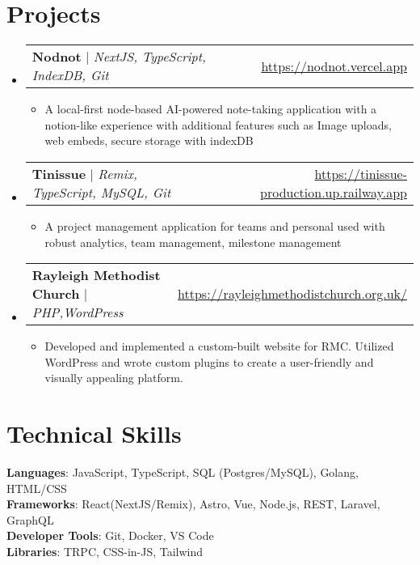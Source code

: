 \documentclass[letterpaper,11pt]{article}
\makeatletter
\newcommand{\resumeItem}[1]{
  \item\small{
    {#1 \vspace{-2pt}}
  }
}
\newcommand{\resumeProjectHeading}[2]{
    \item
    \begin{tabular*}{0.97\textwidth}{l@{\extracolsep{\fill}}r}
      \small#1 & #2 \\
    \end{tabular*}\vspace{-7pt}
}
\newcommand{\resumeSubHeadingListStart}{\begin{itemize}[leftmargin=0.15in, label={}]}
\newcommand{\resumeSubHeadingListEnd}{\end{itemize}}
\newcommand{\resumeItemListStart}{\begin{itemize}}
\newcommand{\resumeItemListEnd}{\end{itemize}\vspace{-5pt}}
\makeatother
\begin{document}
\section{Projects}
    \resumeSubHeadingListStart
      \resumeProjectHeading
          {\textbf{Nodnot} $|$ \emph{NextJS, TypeScript, IndexDB, Git}}{\url{https://nodnot.vercel.app}}
          \resumeItemListStart
            \resumeItem{A local-first node-based AI-powered note-taking application with a notion-like experience with additional features such as Image uploads, web embeds, secure storage with indexDB}
          \resumeItemListEnd
      \resumeProjectHeading
          {\textbf{Tinissue} $|$ \emph{Remix, TypeScript, MySQL, Git}}{\url{https://tinissue-production.up.railway.app}}
          \resumeItemListStart
            \resumeItem{A project management application for teams and personal used with robust analytics, team management, milestone management}
          \resumeItemListEnd
      \resumeProjectHeading
          {\textbf{Rayleigh Methodist Church} $|$ \emph{PHP,WordPress}}{\url{https://rayleighmethodistchurch.org.uk/}}
          \resumeItemListStart
            \resumeItem{Developed and implemented a custom-built website for RMC. Utilized WordPress and wrote custom plugins to create a user-friendly and visually appealing platform. }
          \resumeItemListEnd
    \resumeSubHeadingListEnd



\section{Technical Skills}
 \begin{itemize}[leftmargin=0.15in, label={}]
    \small{\item{
     \textbf{Languages}{: JavaScript, TypeScript, SQL (Postgres/MySQL), Golang, HTML/CSS} \\
     \textbf{Frameworks}{: React(NextJS/Remix), Astro, Vue, Node.js, REST, Laravel, GraphQL} \\
     \textbf{Developer Tools}{: Git, Docker, VS Code} \\
     \textbf{Libraries}{: TRPC, CSS-in-JS, Tailwind}
    }}
 \end{itemize}


\end{document}
